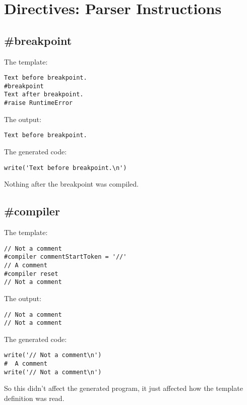 \section{Directives: Parser Instructions}
\label{parserInstructions}


\subsection{\#breakpoint}
\label{parserInstructions.breakpoint}


The template:
\begin{verbatim}
Text before breakpoint.
#breakpoint
Text after breakpoint.
#raise RuntimeError
\end{verbatim}

The output:
\begin{verbatim}
Text before breakpoint.
\end{verbatim}

The generated code:
\begin{verbatim}
write('Text before breakpoint.\n')
\end{verbatim}

Nothing after the breakpoint was compiled.

\subsection{\#compiler}
\label{parserInstructions.compiler}

The template:
\begin{verbatim}
// Not a comment
#compiler commentStartToken = '//'
// A comment
#compiler reset
// Not a comment
\end{verbatim}

The output:
\begin{verbatim}
// Not a comment
// Not a comment
\end{verbatim}

The generated code:
\begin{verbatim}
write('// Not a comment\n')
#  A comment
write('// Not a comment\n')
\end{verbatim}

So this didn't affect the generated program, it just affected how the
template definition was read.

